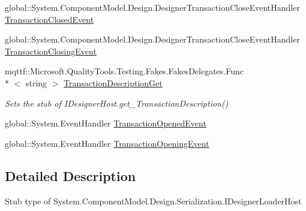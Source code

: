\begin{DoxyCompactItemize}
global\-::\-System.\-Component\-Model.\-Design.\-Designer\-Transaction\-Close\-Event\-Handler \hyperlink{class_system_1_1_component_model_1_1_design_1_1_serialization_1_1_fakes_1_1_stub_i_designer_loader_host_acf294b7443b6b2e31c7e49d13a6f3ef5}{Transaction\-Closed\-Event}
\item 
global\-::\-System.\-Component\-Model.\-Design.\-Designer\-Transaction\-Close\-Event\-Handler \hyperlink{class_system_1_1_component_model_1_1_design_1_1_serialization_1_1_fakes_1_1_stub_i_designer_loader_host_ab3ec0630df6d305d90f23d292d66e6ff}{Transaction\-Closing\-Event}
\item 
mqttf\-::\-Microsoft.\-Quality\-Tools.\-Testing.\-Fakes.\-Fakes\-Delegates.\-Func\\*
$<$ string $>$ \hyperlink{class_system_1_1_component_model_1_1_design_1_1_serialization_1_1_fakes_1_1_stub_i_designer_loader_host_a002bb23601f2ce6083e1497180917984}{Transaction\-Description\-Get}
\begin{DoxyCompactList}\small\item\em Sets the stub of I\-Designer\-Host.\-get\-\_\-\-Transaction\-Description()\end{DoxyCompactList}\item 
global\-::\-System.\-Event\-Handler \hyperlink{class_system_1_1_component_model_1_1_design_1_1_serialization_1_1_fakes_1_1_stub_i_designer_loader_host_a76f769151797f0449e2700981b22f6e1}{Transaction\-Opened\-Event}
\item 
global\-::\-System.\-Event\-Handler \hyperlink{class_system_1_1_component_model_1_1_design_1_1_serialization_1_1_fakes_1_1_stub_i_designer_loader_host_a506ac21ca35aefb87c41a44cacc8841b}{Transaction\-Opening\-Event}
\end{DoxyCompactItemize}


\subsection{Detailed Description}
Stub type of System.\-Component\-Model.\-Design.\-Serialization.\-I\-Designer\-Loader\-Host



